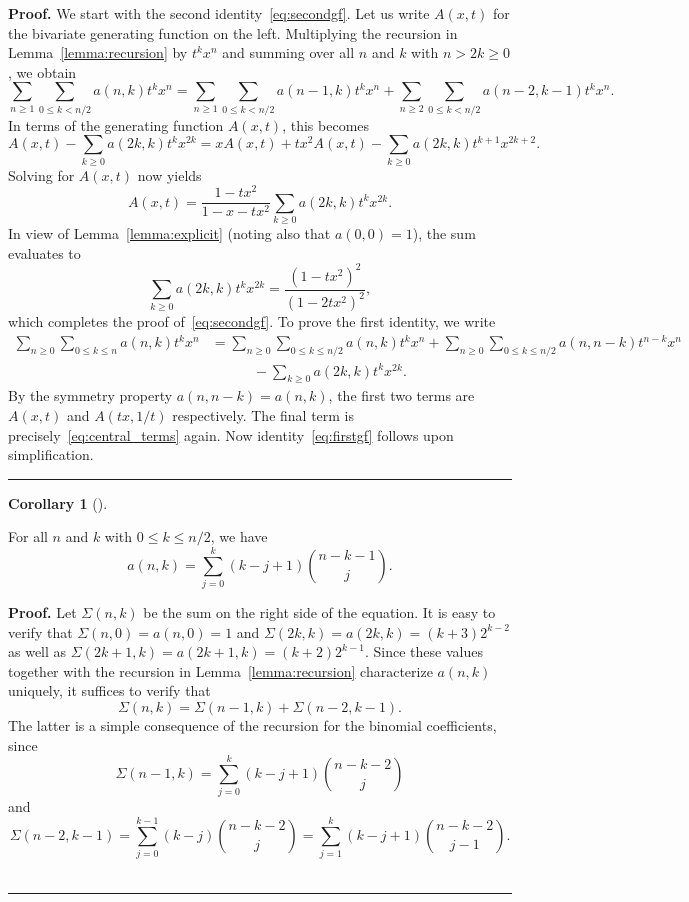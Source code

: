 \documentclass[numbers=enddot,12pt,final,onecolumn,notitlepage]{scrartcl}%
\theoremstyle{definition}
\newtheorem{coro}[theo]{Corollary}
\newenvironment{corollary}[1][]
{\begin{coro}[#1]\begin{leftbar}}
{\end{leftbar}\end{coro}}
\newenvironment{proof}[1][Proof]{\noindent\textbf{#1.} }{\ \rule{0.5em}{0.5em}}
\begin{document}
\begin{proof}
We start with the second identity~\eqref{eq:secondgf}. Let us write $A(x,t)$ for the bivariate generating function on the left. Multiplying the recursion in Lemma~\ref{lemma:recursion} by $t^k x^n$ and summing over all $n$ and $k$ with $n > 2k \geq 0$, we obtain
\[
\sum_{n \geq 1} \sum_{0 \leq k < n/2} a(n,k)t^k x^n = \sum_{n \geq 1} \sum_{0 \leq k < n/2} a(n-1,k)t^k x^n + \sum_{n \geq 2} \sum_{0 \leq k < n/2} a(n-2,k-1)t^k x^n.
\]
In terms of the generating function $A(x,t)$, this becomes
\[
A(x,t) - \sum_{k \geq 0} a(2k,k) t^k x^{2k} = x A(x,t) + tx^2 A(x,t) - \sum_{k \geq 0} a(2k,k) t^{k+1} x^{2k+2}.
\]
Solving for $A(x,t)$ now yields
\begin{equation}\label{eq:Axt-intermediate}
A(x,t) = \frac{1-tx^2}{1-x-tx^2} \sum_{k \geq 0} a(2k,k) t^k x^{2k}.
\end{equation}
In view of Lemma~\ref{lemma:explicit} (noting also that $a(0,0) = 1$), the sum evaluates to 
\begin{equation}\label{eq:central_terms}
    \sum_{k \geq 0} a(2k,k)t^kx^{2k} = \frac{(1-tx^2)^2}{(1-2tx^2)^2},
\end{equation}
which completes the proof of~\eqref{eq:secondgf}. To prove the first identity, we write
\begin{align*}
\sum_{n \geq 0} \sum_{0 \leq k \leq n} a(n,k)t^k x^n &=
\sum_{n \geq 0} \sum_{0 \leq k \leq n/2} a(n,k)t^k x^n + \sum_{n \geq 0} \sum_{0 \leq k \leq n/2} a(n,n-k)t^{n-k} x^n \\
&\qquad\quad - \sum_{k \geq 0} a(2k,k) t^k x^{2k}.
\end{align*}
By the symmetry property $a(n,n-k) = a(n,k)$, the first two terms are $A(x,t)$ and $A(tx,1/t)$ respectively. The final term is precisely~\eqref{eq:central_terms} again. Now identity~\eqref{eq:firstgf} follows upon simplification.
\end{proof}

\begin{corollary}\label{cor:sumformula}
For all $n$ and $k$ with $0 \leq k \leq n/2$, we have
\[
a(n,k) = \sum_{j=0}^k (k-j+1) \binom{n-k-1}{j}.
\]
\end{corollary}

\begin{proof}
Let $\Sigma(n,k)$ be the sum on the right side of the equation. It is easy to verify that $\Sigma(n,0) = a(n,0) = 1$ and $\Sigma(2k,k) = a(2k,k) = (k + 3)2^{k-2}$ as well as $\Sigma(2k+1,k) = a(2k+1,k) = (k + 2)2^{k-1}$. Since these values together with the recursion in Lemma~\ref{lemma:recursion} characterize $a(n,k)$ uniquely, it suffices to verify that
\[
\Sigma(n,k) = \Sigma(n-1,k) + \Sigma(n-2,k-1).
\]
The latter is a simple consequence of the recursion for the binomial coefficients, since
\[
\Sigma(n-1,k) = \sum_{j = 0}^k  (k - j + 1) \binom{n - k - 2}{j}
\]
and
\[
\Sigma(n-2,k-1) = \sum_{j = 0}^{k-1} (k-j)\binom{n-k-2}{j} = \sum_{j = 1}^{k} (k-j+1)\binom{n-k-2}{j-1}.
\]
\end{proof}
\end{document}
